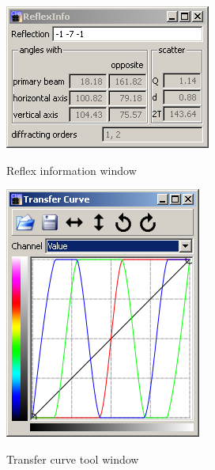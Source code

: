 \begin{figure}[htb]
  \centering
  \begin{minipage}[b]{0.4\textwidth}
    \includegraphics[width=\textwidth]{clip/Tool_ReflexInfo}
    \label{Clip:FigToolReflexInfo}
    \caption{Reflex information window}
  \end{minipage}
  \imgspace{}
  \begin{minipage}[b]{0.4\textwidth}
    \includegraphics[width=\textwidth]{clip/Tool_TransferCurve}
    \label{Clip:FigToolTransferCurve}
    \caption{Transfer curve tool window}
  \end{minipage}
\end{figure}

